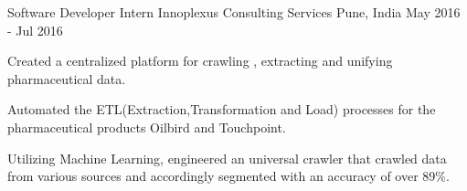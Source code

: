 \begin{cventries}
  \cventry
    {Software Developer Intern} %
    {Innoplexus Consulting Services} %
    {Pune, India} %
    { May 2016 - Jul 2016 } %
    {
      \begin{cvitems} %
        \item {Created a centralized platform for crawling , extracting and unifying pharmaceutical data.}
        \item {Automated the ETL(Extraction,Transformation and Load)
processes for the pharmaceutical products Oilbird and Touchpoint.}
        \item {Utilizing Machine Learning, engineered an universal crawler that crawled data from various sources and accordingly segmented with an accuracy of over 89\%.}
      \end{cvitems}
    }
    


\end{cventries}
